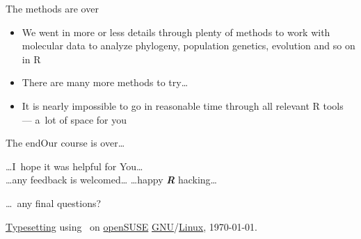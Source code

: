 \documentclass[compress, ucs, xelatex, 11pt, xcolor=svgnames,
  hyperref={
    bookmarks=true,
    unicode=true,
    colorlinks=true,
    pdftitle={Molecular data in R},
    plainpages=false,
    pdfauthor={Vojtech Zeisek},
    pdfsubject={Course about phylogeny and evolution in R},
    pdfcreator={XeLaTeX},
    pdfkeywords={R, evolution, phylogeny, molecular data},
    linkcolor=Tomato,
    anchorcolor=SaddleBrown,
    citecolor=Goldenrod,
    filecolor=DarkMagenta,
    menucolor=Sienna,
    urlcolor=DarkTurquoise,
    pdftex},
  url={hyphens, lowtilde} %
  ]{beamer}
\begin{document}
\begin{frame}{The methods are over}
  \begin{itemize}
    \item We went in more or less details through plenty of methods to work with molecular data to analyze phylogeny, population genetics, evolution and so on in R
    \item There are many more methods to try\ldots
    \item It is nearly impossible to go in reasonable time through all relevant R tools --- a~lot of space for you
  \end{itemize}
\end{frame}

\begin{frame}{The end}{Our course is over\ldots}
  \begin{center}
    \ldots I~hope it was helpful for You\ldots\\
    \vfill
    \ldots any feedback is welcomed\ldots
    \vfill
    \ldots happy \textbf{\textit{R}} hacking\ldots
    \vfill
  \end{center}
  \begin{flushright}
    \ldots~any final questions?
    \vfill
    \begin{tiny}
    \href{https://en.wikipedia.org/wiki/XeTeX}{Typesetting} using \XeLaTeX~on \href{https://www.opensuse.org/}{openSUSE} \href{https://en.wikipedia.org/wiki/GNU}{GNU}/\href{https://en.wikipedia.org/wiki/Linux}{Linux}, \today.
    \end{tiny}
  \end{flushright}
\end{frame}
\end{document}
